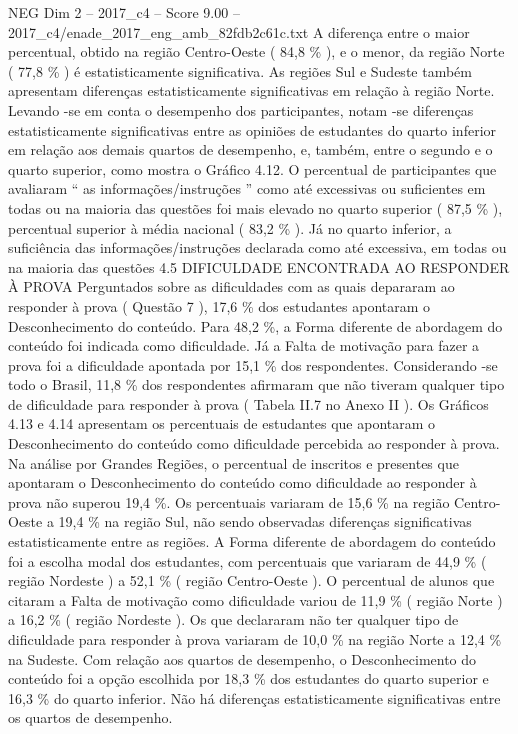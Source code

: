 \begin{textsample}{NEG Dim 2 – 2017\_c4 – Score 9.00 – 2017\_c4/enade\_2017\_eng\_amb\_82fdb2c61c.txt}
A diferença entre o maior percentual, obtido na região Centro-Oeste ( 84,8 \% ), e o menor, da região Norte ( 77,8 \% ) é estatisticamente significativa.
As regiões Sul e Sudeste também apresentam diferenças estatisticamente significativas em relação à região Norte.
Levando -se em conta o desempenho dos participantes, notam -se diferenças estatisticamente significativas entre as opiniões de estudantes do quarto inferior em relação aos demais quartos de desempenho, e, também, entre o segundo e o quarto superior, como mostra o Gráfico 4.12.
O percentual de participantes que avaliaram “ as informações/instruções ” como até excessivas ou suficientes em todas ou na maioria das questões foi mais elevado no quarto superior ( 87,5 \% ), percentual superior à média nacional ( 83,2 \% ).
Já no quarto inferior, a suficiência das informações/instruções declarada como até excessiva, em todas ou na maioria das questões 4.5 DIFICULDADE ENCONTRADA AO RESPONDER À PROVA Perguntados sobre as dificuldades com as quais depararam ao responder à prova ( Questão 7 ), 17,6 \% dos estudantes apontaram o Desconhecimento do conteúdo.
Para 48,2 \%, a Forma diferente de abordagem do conteúdo foi indicada como dificuldade.
Já a Falta de motivação para fazer a prova foi a dificuldade apontada por 15,1 \% dos respondentes.
Considerando -se todo o Brasil, 11,8 \% dos respondentes afirmaram que não tiveram qualquer tipo de dificuldade para responder à prova ( Tabela II.7 no Anexo II ).
Os Gráficos 4.13 e 4.14 apresentam os percentuais de estudantes que apontaram o Desconhecimento do conteúdo como dificuldade percebida ao responder à prova.
Na análise por Grandes Regiões, o percentual de inscritos e presentes que apontaram o Desconhecimento do conteúdo como dificuldade ao responder à prova não superou 19,4 \%.
Os percentuais variaram de 15,6 \% na região Centro-Oeste a 19,4 \% na região Sul, não sendo observadas diferenças significativas estatisticamente entre as regiões.
A Forma diferente de abordagem do conteúdo foi a escolha modal dos estudantes, com percentuais que variaram de 44,9 \% ( região Nordeste ) a 52,1 \% ( região Centro-Oeste ).
O percentual de alunos que citaram a Falta de motivação como dificuldade variou de 11,9 \% ( região Norte ) a 16,2 \% ( região Nordeste ).
Os que declararam não ter qualquer tipo de dificuldade para responder à prova variaram de 10,0 \% na região Norte a 12,4 \% na Sudeste.
Com relação aos quartos de desempenho, o Desconhecimento do conteúdo foi a opção escolhida por 18,3 \% dos estudantes do quarto superior e 16,3 \% do quarto inferior.
Não há diferenças estatisticamente significativas entre os quartos de desempenho.

\end{textsample}
